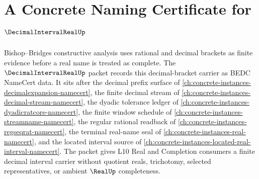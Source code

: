 \chapter{A Concrete Naming Certificate for $\DecimalIntervalRealUp$}
\label{ch:concrete-instances-decimal-interval-real-namecert}

Bishop--Bridges constructive analysis uses rational and decimal brackets as finite evidence before a real name is treated as complete. The $\DecimalIntervalRealUp$ packet records this decimal-bracket carrier as BEDC NameCert data. It sits after the decimal prefix surface of \autoref{ch:concrete-instances-decimalexpansion-namecert}, the finite decimal stream of \autoref{ch:concrete-instances-decimal-stream-namecert}, the dyadic tolerance ledger of \autoref{ch:concrete-instances-dyadicratcore-namecert}, the finite window schedule of \autoref{ch:concrete-instances-streamname-namecert}, the regular rational readback of \autoref{ch:concrete-instances-regseqrat-namecert}, the terminal real-name seal of \autoref{ch:concrete-instances-real-namecert}, and the located interval source of \autoref{ch:concrete-instances-located-real-interval-namecert}. The packet gives L10 Real and Completion consumers a finite decimal interval carrier without quotient reals, trichotomy, selected representatives, or ambient $\RealUp$ completeness.

